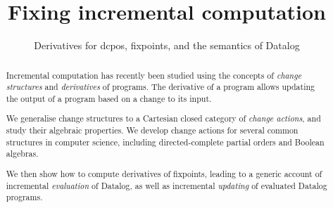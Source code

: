 
%


\usepackage[utf8]{inputenc}
\usepackage{amsmath}
\usepackage{amssymb}
\usepackage{amsthm}
\usepackage{mathtools}
\usepackage{stmaryrd}
\usepackage{thmtools}
\usepackage{todonotes}
\usepackage{etoolbox}
\usepackage{appendix}

\usepackage[safeinputenc,natbib=true]{biblatex}
\usepackage{cleveref}
\usepackage{hyperref}

\newcommand{\todoall}[1]{\todo[inline,color=black!30,author=All]{#1}}
\newcommand{\todokcg}[1]{\todo[inline,color=pink!60,author=Katriel]{#1}}
\newcommand{\todompj}[1]{\todo[inline,color=yellow!40,author=Michael]{#1}}
\newcommand{\todomario}[1]{\todo[inline,color=blue!40,author=Mario]{#1}}



\newif\ifproofs





%


\begin{abstract}
  Incremental computation has recently been studied using the concepts of \emph{change
  structures} and \emph{derivatives} of programs. The derivative of a program allows updating the output
  of a program based on a change to its input.

  We generalise change structures to a Cartesian closed category of \emph{change actions},
  and study their algebraic properties. We develop change actions for several common structures
  in computer science, including directed-complete partial orders and Boolean algebras.

  We then show how to compute derivatives of fixpoints, leading to a
  generic account of incremental \emph{evaluation} of Datalog,
  as well as incremental \emph{updating} of evaluated Datalog programs.
\end{abstract}

\title{Fixing incremental computation}
\subtitle{Derivatives for dcpos, fixpoints, and the semantics of Datalog}

\maketitle

